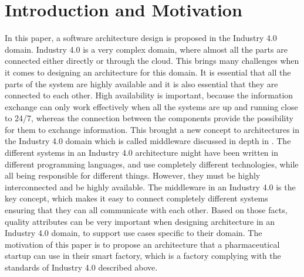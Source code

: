 \section{Introduction and Motivation}

In this paper, a software architecture design is proposed in the Industry 4.0 domain. Industry 4.0 is a very complex domain, where almost all the parts are connected either directly or through the cloud. This brings many challenges when it comes to designing an architecture for this domain. It is essential that all the parts of the system are highly available and it is also essential that they are connected to each other. High availability is important, because the information exchange can only work effectively when all the systems are up and running close to 24/7, whereas the connection between the components provide the possibility for them to exchange information. This brought a new concept to architectures in the Industry 4.0 domain which is called middleware discussed in depth in \cite{analysisInterop}. The different systems in an Industry 4.0 architecture might have been written in different programming languages, and use completely different technologies, while all being responsible for different things. However, they must be highly interconnected and be highly available. The middleware in an Industry 4.0 is the key concept, which makes it easy to connect completely different systems ensuring that they can all communicate with each other. Based on those facts, quality attributes can be very important when designing architecture in an Industry 4.0 domain, to support use cases specific to their domain. The motivation of this paper is to propose an architecture that a pharmaceutical startup can use in their smart factory, which is a factory complying with the standards of Industry 4.0 described above. 


